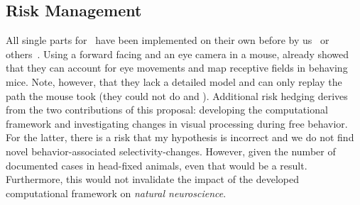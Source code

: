 \documentclass[COG,11pt]{ercgrant}
\begin{document}
\subsection{Risk Management}
All single parts for~ have been implemented on their own before by us~\parencite{Sinz2018-sk, Bashiri2021-or} or others~\parencite{Parker2022-ac,Holmgren2021-jv}. 
Using a forward facing and an eye camera in a mouse, \textcite{Parker2022-ac} already showed that they can account for eye movements and map receptive fields in behaving mice. 
Note, however, that they lack a detailed model and can only replay the path the mouse took (they could not do  and ). 
Additional risk hedging derives from the two contributions of this proposal: developing the computational framework and investigating changes in visual processing during free behavior.
For the latter, there is a risk that my hypothesis is incorrect and we do not find novel behavior-associated selectivity-changes. 
However, given the number of documented cases in head-fixed animals, even that would be a result. 
Furthermore, this would not invalidate the impact of the developed computational framework on \textit{natural neuroscience}. 




\begin{small}
\printbibliography
\end{small}

% 	
% 	
\end{document}
